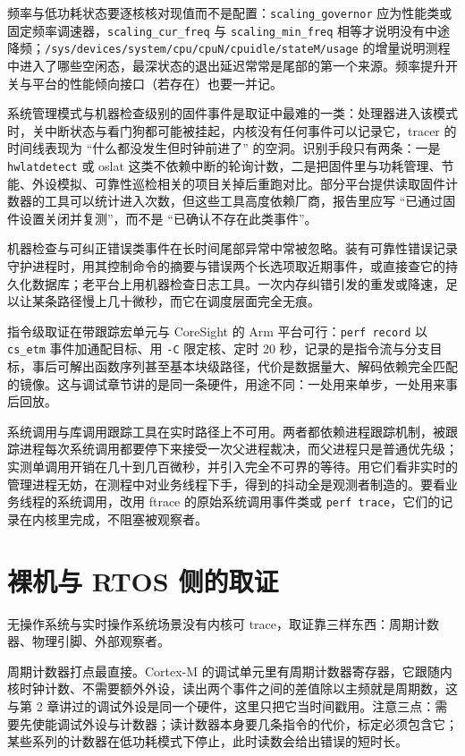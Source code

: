 \documentclass[12pt,a4paper,fontset=fandol]{ctexbook}
\newcommand{\Tp}[1]{\texttt{#1}}
\begin{document}
频率与低功耗状态要逐核核对现值而不是配置：\Tp{scaling\_governor} 应为性能类或固定频率调速器，\Tp{scaling\_cur\_freq} 与 \Tp{scaling\_min\_freq} 相等才说明没有中途降频；\Tp{/sys/devices/system/cpu/cpuN/cpuidle/stateM/usage} 的增量说明测程中进入了哪些空闲态，最深状态的退出延迟常常是尾部的第一个来源。频率提升开关与平台的性能倾向接口（若存在）也要一并记。

系统管理模式与机器检查级别的固件事件是取证中最难的一类：处理器进入该模式时，关中断状态与看门狗都可能被挂起，内核没有任何事件可以记录它，tracer 的时间线表现为 ``什么都没发生但时钟前进了'' 的空洞。识别手段只有两条：一是 \Tp{hwlatdetect} 或 oslat 这类不依赖中断的轮询计数，二是把固件里与功耗管理、节能、外设模拟、可靠性巡检相关的项目关掉后重跑对比。部分平台提供读取固件计数器的工具可以统计进入次数，但这些工具高度依赖厂商，报告里应写 ``已通过固件设置关闭并复测''，而不是 ``已确认不存在此类事件''。

机器检查与可纠正错误类事件在长时间尾部异常中常被忽略。装有可靠性错误记录守护进程时，用其控制命令的摘要与错误两个长选项取近期事件，或直接查它的持久化数据库；老平台上用机器检查日志工具。一次内存纠错引发的重发或降速，足以让某条路径慢上几十微秒，而它在调度层面完全无痕。

指令级取证在带跟踪宏单元与 CoreSight 的 Arm 平台可行：\Tp{perf record} 以 \Tp{cs\_etm} 事件加通配目标、用 \Tp{-C} 限定核、定时 20 秒，记录的是指令流与分支目标，事后可解出函数序列甚至基本块级路径，代价是数据量大、解码依赖完全匹配的镜像。这与调试章节讲的是同一条硬件，用途不同：一处用来单步，一处用来事后回放。

系统调用与库调用跟踪工具在实时路径上不可用。两者都依赖进程跟踪机制，被跟踪进程每次系统调用都要停下来接受一次父进程裁决，而父进程只是普通优先级；实测单调用开销在几十到几百微秒，并引入完全不可界的等待。用它们看非实时的管理进程无妨，在测程中对业务线程下手，得到的抖动全是观测者制造的。要看业务线程的系统调用，改用 ftrace 的原始系统调用事件类或 \Tp{perf trace}，它们的记录在内核里完成，不阻塞被观察者。

\section{裸机与 RTOS 侧的取证}

无操作系统与实时操作系统场景没有内核可 trace，取证靠三样东西：周期计数器、物理引脚、外部观察者。

周期计数器打点最直接。Cortex-M 的调试单元里有周期计数器寄存器，它跟随内核时钟计数、不需要额外外设，读出两个事件之间的差值除以主频就是周期数，这与第 2 章讲过的调试外设是同一个硬件，这里只把它当时间戳用。注意三点：需要先使能调试外设与计数器；读计数器本身要几条指令的代价，标定必须包含它；某些系列的计数器在低功耗模式下停止，此时读数会给出错误的短时长。
\end{document}
